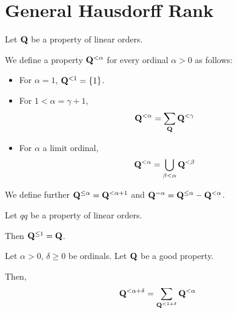 
\section{General Hausdorff Rank}

\begin{definition}
  Let $\mathbf{Q}$ be a property of linear orders.

  We define a property $\mathbf{Q}^{< \alpha}$
  for every ordinal $\alpha > 0$ as follows:

  \begin{itemize}
    \item For $\alpha = 1$, $\mathbf{Q}^{< 1} = \left\{ {1} \right\}$.
    \item For $1 < \alpha = \gamma + 1$,
          \[\mathbf{Q}^{< \alpha} = \sum_{\mathbf{Q}}{\mathbf{Q}^{< \gamma}}\]
    \item For $\alpha$ a limit ordinal,
          \[\mathbf{Q}^{< \alpha} = \bigcup_{\beta < \alpha} \mathbf{Q}^{< \beta}\]
  \end{itemize}

  We define further $\mathbf{Q}^{\le \alpha} = \mathbf{Q}^{< \alpha + 1}$
  and $\mathbf{Q}^{= \alpha} = \mathbf{Q}^{\le \alpha} - \mathbf{Q}^{< \alpha}$.
\end{definition}

\begin{observation}
  Let $qq$ be a property of linear orders.

  Then $\mathbf{Q}^{\le 1} = \mathbf{Q}$.
\end{observation}


\begin{lemma}
  Let $\alpha > 0$, $\delta \ge 0$ be ordinals. Let $\mathbf{Q}$ be a good property.

  Then,
  \[
    \mathbf{Q}^{< \alpha + \delta}
    = \sum_{\mathbf{Q}^{< 1 + \delta}}{\mathbf{Q}^{< \alpha}}
  \]
\end{lemma}

